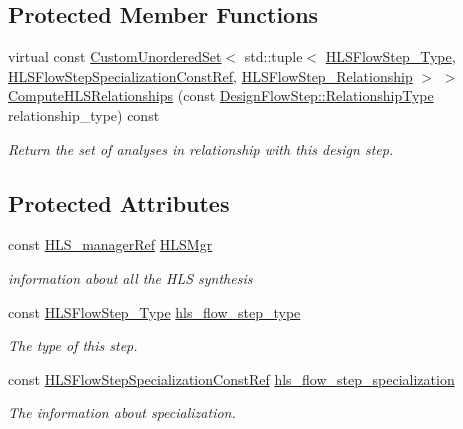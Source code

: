 \subsection*{Protected Member Functions}
\begin{DoxyCompactItemize}
\item 
virtual const \hyperlink{classCustomUnorderedSet}{Custom\+Unordered\+Set}$<$ std\+::tuple$<$ \hyperlink{hls__step_8hpp_ada16bc22905016180e26fc7e39537f8d}{H\+L\+S\+Flow\+Step\+\_\+\+Type}, \hyperlink{hls__step_8hpp_a5fdd2edf290c196531d21d68e13f0e74}{H\+L\+S\+Flow\+Step\+Specialization\+Const\+Ref}, \hyperlink{hls__step_8hpp_a3ad360b9b11e6bf0683d5562a0ceb169}{H\+L\+S\+Flow\+Step\+\_\+\+Relationship} $>$ $>$ \hyperlink{classHLS__step_aed0ce8cca9a1ef18e705fc1032ad4de5}{Compute\+H\+L\+S\+Relationships} (const \hyperlink{classDesignFlowStep_a723a3baf19ff2ceb77bc13e099d0b1b7}{Design\+Flow\+Step\+::\+Relationship\+Type} relationship\+\_\+type) const
\begin{DoxyCompactList}\small\item\em Return the set of analyses in relationship with this design step. \end{DoxyCompactList}\end{DoxyCompactItemize}
\subsection*{Protected Attributes}
\begin{DoxyCompactItemize}
\item 
const \hyperlink{hls__manager_8hpp_acd3842b8589fe52c08fc0b2fcc813bfe}{H\+L\+S\+\_\+manager\+Ref} \hyperlink{classHLS__step_ade85003a99d34134418451ddc46a18e9}{H\+L\+S\+Mgr}
\begin{DoxyCompactList}\small\item\em information about all the H\+LS synthesis \end{DoxyCompactList}\item 
const \hyperlink{hls__step_8hpp_ada16bc22905016180e26fc7e39537f8d}{H\+L\+S\+Flow\+Step\+\_\+\+Type} \hyperlink{classHLS__step_aefd59af15346ec3f10bf12bd756e6777}{hls\+\_\+flow\+\_\+step\+\_\+type}
\begin{DoxyCompactList}\small\item\em The type of this step. \end{DoxyCompactList}\item 
const \hyperlink{hls__step_8hpp_a5fdd2edf290c196531d21d68e13f0e74}{H\+L\+S\+Flow\+Step\+Specialization\+Const\+Ref} \hyperlink{classHLS__step_a843be75ba53b81876aa3c8b870ae8a55}{hls\+\_\+flow\+\_\+step\+\_\+specialization}
\begin{DoxyCompactList}\small\item\em The information about specialization. \end{DoxyCompactList}\end{DoxyCompactItemize}
